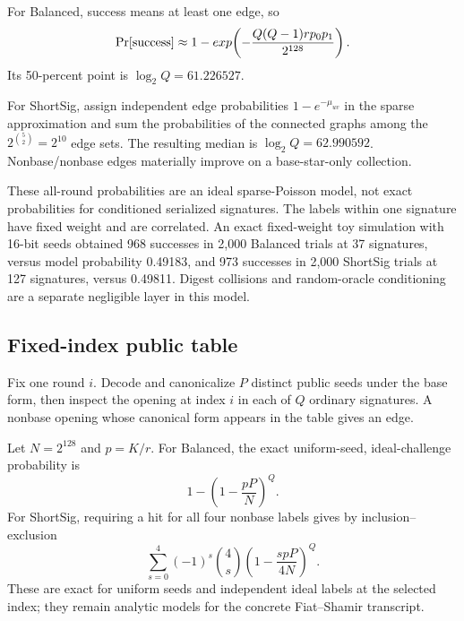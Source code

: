 \documentclass[11pt,a4paper]{article}
\newcommand{\Prb}{\mathop{\rm Pr}}
\begin{document}
For Balanced, success means at least one edge, so
\begin{equation}
 \Prb[\mathrm{success}]\approx 1-exp\!\left(
  -\frac{Q(Q-1)r p_0p_1}{2^{128}}\right).              \label{eq:balprob}
\end{equation}
Its 50-percent point is $\log_2Q=61.226527$.

For ShortSig, assign independent edge probabilities
$1-e^{-\mu_{uv}}$ in the sparse approximation and sum the probabilities of
the connected graphs among the $2^{\binom52}=2^{10}$ edge sets.  The resulting
median is $\log_2Q=62.990592$.  Nonbase/nonbase edges materially improve on a
base-star-only collection.

These all-round probabilities are an ideal sparse-Poisson model, not exact
probabilities for conditioned serialized signatures.  The labels within one
signature have fixed weight and are correlated.  An exact fixed-weight toy
simulation with 16-bit seeds obtained 968 successes in 2,000 Balanced trials
at 37 signatures, versus model probability 0.49183, and 973 successes in 2,000
ShortSig trials at 127 signatures, versus 0.49811.  Digest collisions and
random-oracle conditioning are a separate negligible layer in this model.

\subsection{Fixed-index public table}

Fix one round $i$.  Decode and canonicalize $P$ distinct public seeds under the
base form, then inspect the opening at index $i$ in each of $Q$ ordinary
signatures.  A nonbase opening whose canonical form appears in the table gives
an edge.

Let $N=2^{128}$ and $p=K/r$.  For Balanced, the exact uniform-seed,
ideal-challenge probability is
\begin{equation}
                    1-\left(1-\frac{pP}{N}\right)^Q.   \label{eq:fixedbal}
\end{equation}
For ShortSig, requiring a hit for all four nonbase labels gives by
inclusion--exclusion
\begin{equation}
 \sum_{s=0}^{4}(-1)^s\binom4s
       \left(1-\frac{s pP}{4N}\right)^Q.               \label{eq:fixedshort}
\end{equation}
These are exact for uniform seeds and independent ideal labels at the selected
index; they remain analytic models for the concrete Fiat--Shamir transcript.
\end{document}
